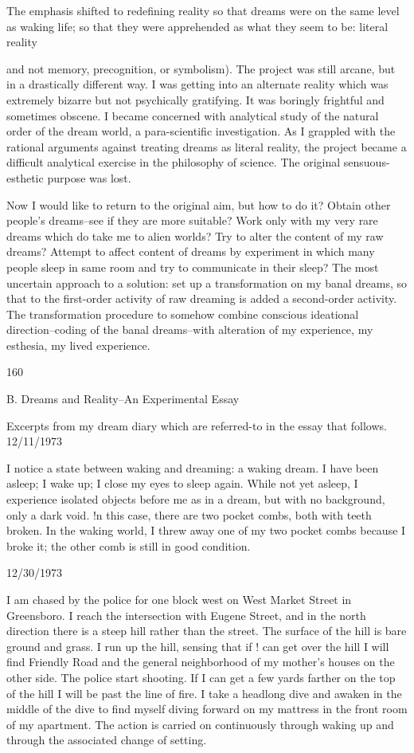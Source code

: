 \documentclass[10pt,twoside]{memoir}
\begin{document}
\begin{enumerate}
The emphasis shifted to redefining reality so that dreams were on the same 
level as waking life; so that they were apprehended as what they seem to be: 
literal reality {and not memory, precognition, or symbolism). The project 
was still arcane, but in a drastically different way. I was getting into an 
alternate reality which was extremely bizarre but not psychically gratifying. 
It was boringly frightful and sometimes obscene. I became concerned with 
analytical study of the natural order of the dream world, a para-scientific 
investigation. As I grappled with the rational arguments against treating 
dreams as literal reality, the project became a difficult analytical exercise in 
the philosophy of science. The original sensuous-esthetic purpose was lost. 


Now I would like to return to the original aim, but how to do it? Obtain 
other people's dreams--see if they are more suitable? Work only with my 
very rare dreams which do take me to alien worlds? Try to alter the content 
of my raw dreams? Attempt to affect content of dreams by experiment in 
which many people sleep in same room and try to communicate in their 
sleep? The most uncertain approach to a solution: set up a transformation 
on my banal dreams, so that to the first-order activity of raw dreaming is 
added a second-order activity. The transformation procedure to somehow 
combine conscious ideational direction--coding of the banal dreams--with 
alteration of my experience, my esthesia, my lived experience. 


160 


B. Dreams and Reality--An Experimental Essay 


Excerpts from my dream diary which are referred-to in the essay that 
follows. 
12/11/1973 

I notice a state between waking and dreaming: a waking dream. I have 
been asleep; I wake up; I close my eyes to sleep again. While not yet asleep, I 
experience isolated objects before me as in a dream, but with no 
background, only a dark void. !n this case, there are two pocket combs, both 
with teeth broken. In the waking world, I threw away one of my two pocket 
combs because I broke it; the other comb is still in good condition. 


12/30/1973 

I am chased by the police for one block west on West Market Street in 
Greensboro. I reach the intersection with Eugene Street, and in the north 
direction there is a steep hill rather than the street. The surface of the hill is 
bare ground and grass. I run up the hill, sensing that if ! can get over the hill 
I will find Friendly Road and the general neighborhood of my mother's 
houses on the other side. The police start shooting. If I can get a few yards 
farther on the top of the hill I will be past the line of fire. I take a headlong 
dive and awaken in the middle of the dive to find myself diving forward on 
my mattress in the front room of my apartment. The action is carried on 
continuously through waking up and through the associated change of 
setting. 


}
\end{enumerate}
\end{document}
